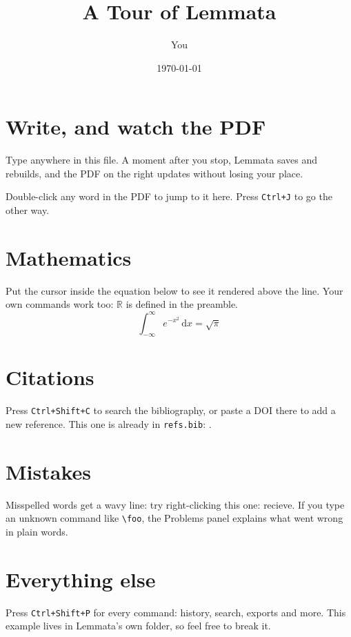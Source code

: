 \documentclass[11pt]{article}
\title{A Tour of Lemmata}
\author{You}
\date{\today}
\newcommand{\R}{\mathbb{R}}
\begin{document}
\maketitle

\section{Write, and watch the PDF}
Type anywhere in this file. A moment after you stop, Lemmata saves and
rebuilds, and the PDF on the right updates without losing your place.

Double-click any word in the PDF to jump to it here. Press \texttt{Ctrl+J} to go
the other way.

\section{Mathematics}
Put the cursor inside the equation below to see it rendered above the line.
Your own commands work too: $\R$ is defined in the preamble.
\begin{equation}
  \int_{-\infty}^{\infty} e^{-x^2}\,\mathrm{d}x = \sqrt{\pi}
\end{equation}

\section{Citations}
Press \texttt{Ctrl+Shift+C} to search the bibliography, or paste a DOI there to add
a new reference. This one is already in \texttt{refs.bib}:
\textcite{knuth1984}.

\section{Mistakes}
Misspelled words get a wavy line: try right-clicking this one: recieve.
If you type an unknown command like \texttt{\textbackslash foo}, the
Problems panel explains what went wrong in plain words.

\section{Everything else}
Press \texttt{Ctrl+Shift+P} for every command: history, search, exports and more.
This example lives in Lemmata's own folder, so feel free to break it.

\printbibliography
\end{document}
